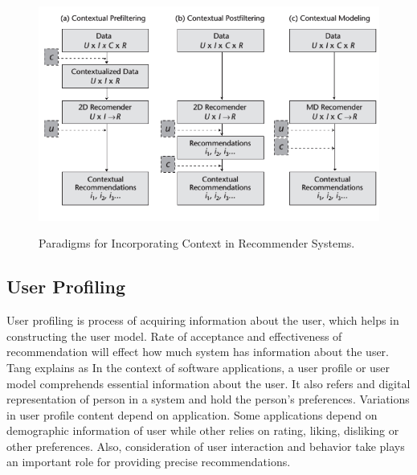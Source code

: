 \begin{figure}[h]
	\centering
	\includegraphics[width=1\linewidth]{figures/ch2_context_recommender_system_paradigms.png}
	\caption{Paradigms for Incorporating Context in Recommender Systems.}
	\cite{adomavicius2011context}
	\label{fig:ch2_context_recommender_system_paradigms}
\end{figure}


\subsection{User Profiling}

User profiling is process of acquiring information about the user, which helps in constructing the user model. Rate of acceptance and effectiveness of recommendation will effect how much system has information about the user. Tang \cite{tang2010combination} explains as  In the context of software applications, a user profile or user model comprehends essential information about the user. It also refers and digital representation of person in a system and hold the person’s preferences. Variations in user profile content depend on application. Some applications depend on demographic information of user while other relies on rating, liking, disliking or other preferences. Also, consideration of user interaction and behavior take plays an important role for providing precise recommendations.\newline

